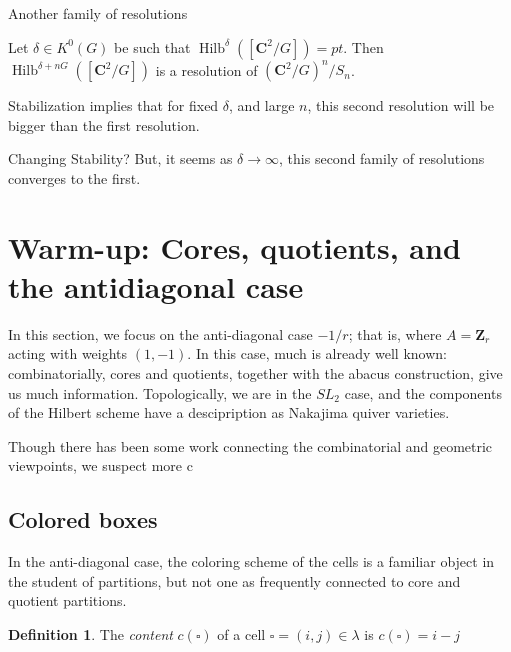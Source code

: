 \documentclass{amsart}[12pt]
\theoremstyle{definition}
\newtheorem{definition}[dummy]{Definition}
\newcommand{\Z}{\mathbf{Z}}
\newcommand{\C}{\mathbf{C}}
\DeclareMathOperator{\Hilb}{Hilb}
\begin{document}
Another family of resolutions

Let $\delta\in K^0(G)$ be such that $\Hilb^\delta([\C^2/G])=pt$.  Then $\Hilb^{\delta+nG}([\C^2/G])$ is a resolution of $(\C^2/G)^n/S_n$.  



Stabilization implies that for fixed $\delta$, and large $n$, this second resolution will be bigger than the first resolution.

Changing Stability?
But, it seems as $\delta\to\infty$, this second family of resolutions converges to the first.


\section{Warm-up: Cores, quotients, and the antidiagonal case}

In this section, we focus on the anti-diagonal case $-1/r$; that is, where $A=\Z_r$ acting with weights $(1,-1)$.  In this case, much is already well known: combinatorially, cores and quotients, together with the abacus construction, give us much information.  Topologically, we are in the $SL_2$ case, and the components of the Hilbert scheme have a descipription as Nakajima quiver varieties. 

Though there has been some work connecting the combinatorial and geometric viewpoints, we suspect more c

\subsection{Colored boxes}

In the anti-diagonal case, the coloring scheme of the cells is a familiar object in the student of partitions, but not one as frequently connected to core and quotient partitions.

\begin{definition}
The \emph{content} $c(\square)$ of a cell $\square=(i,j)\in\lambda$ is $c(\square)=i-j$
\end{definition}

\end{document}
